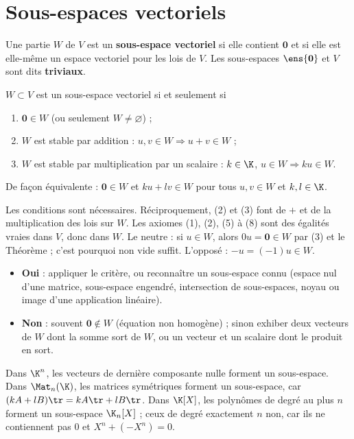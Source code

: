 \section{Sous-espaces vectoriels}
\begin{definition}
Une partie $W$ de $V$ est un \textbf{sous-espace vectoriel} si elle contient $\mathbf 0$ et si elle est elle-même un espace vectoriel pour les lois de $V$. Les sous-espaces $\ens{\mathbf 0}$ et $V$ sont dits \textbf{triviaux}.
\end{definition}
\begin{theoreme}\label{thm-critere-sev}
$W\subset V$ est un sous-espace vectoriel si et seulement si
\begin{enumerate}
\item $\mathbf 0\in W$ (ou seulement $W\neq\varnothing$) ;
\item $W$ est stable par addition : $u,v\in W\Rightarrow u+v\in W$ ;
\item $W$ est stable par multiplication par un scalaire : $k\in\K$, $u\in W\Rightarrow ku\in W$.
\end{enumerate}
De façon équivalente : $\mathbf 0\in W$ et $ku+lv\in W$ pour tous $u,v\in W$ et $k,l\in\K$.
\end{theoreme}
\begin{preuve}
Les conditions sont nécessaires. Réciproquement, (2) et (3) font de $+$ et de la multiplication des lois sur $W$. Les axiomes (1), (2), (5) à (8) sont des égalités vraies dans $V$, donc dans $W$. Le neutre : si $u\in W$, alors $0u=\mathbf 0\in W$ par (3) et le Théorème  ; c'est pourquoi \og non vide \fg{} suffit. L'opposé : $-u=(-1)u\in W$.
\end{preuve}
\begin{methode}
\begin{itemize}
\item \textbf{Oui} : appliquer le critère, ou reconnaître un sous-espace connu (espace nul d'une matrice, sous-espace engendré, intersection de sous-espaces, noyau ou image d'une application linéaire).
\item \textbf{Non} : souvent $\mathbf 0\notin W$ (équation non homogène) ; sinon exhiber deux vecteurs de $W$ dont la somme sort de $W$, ou un vecteur et un scalaire dont le produit en sort.
\end{itemize}
\end{methode}
\begin{exemple}
Dans $\K^n$, les vecteurs de dernière composante nulle forment un sous-espace. Dans $\Mat_n(\K)$, les matrices symétriques forment un sous-espace, car $(kA+lB)\tr=kA\tr+lB\tr$. Dans $\K[X]$, les polynômes de degré au plus $n$ forment un sous-espace $\K_n[X]$ ; ceux de degré exactement $n$ non, car ils ne contiennent pas $0$ et $X^n+(-X^n)=0$.
\end{exemple}
